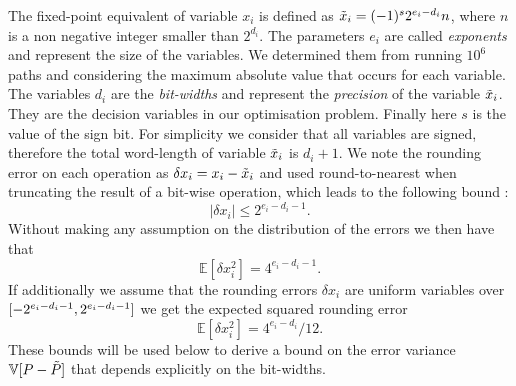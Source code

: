 The fixed-point equivalent of variable $x_i$ is defined as $\Tilde{x}_i = (-1)^s 2^{e_i-d_i}n$, where $n$ is a non negative integer smaller than $2^{d_i}$. The parameters $e_i$ are called \textit{exponents} and represent the size of the variables. We determined them from running $10^6$ paths and considering the maximum absolute value that occurs for each variable. The variables $d_i$ are the \textit{bit-widths} and represent the \textit{precision} of the variable $\Tilde{x}_i$. They are the decision variables in our optimisation problem. Finally here $s$ is the value of the sign bit. For simplicity we consider that all variables are signed, therefore the total word-length of variable $\Tilde{x}_i$ is $d_i+1$. We note the rounding error on each operation as $\delta x_i = x_i - \Tilde{x}_i$ and used round-to-nearest when truncating the result of a bit-wise operation, which leads to the following bound :
\begin{equation}\label{bound_rounding_error}
    |\delta x_i | \leq 2^{e_i-d_i-1}.
\end{equation}
Without making any assumption on the distribution of the errors we then have that
\begin{equation} \label{bound_err2}
    \mathbb{E}[\delta x_i^2] = 4^{e_i-d_i-1}.
\end{equation}
If additionally we assume that the rounding errors $\delta x_i$ are uniform variables over $[-2^{e_i-d_i-1},\\ 2^{e_i-d_i-1}]$ we get the expected squared rounding error
\begin{equation} \label{bound_err}
    \mathbb{E}[\delta x_i^2] = 4^{e_i-d_i}/12.
\end{equation}
These bounds will be used below to derive a bound on the error variance $\mathbb{V}[P-\Tilde{P}]$ that depends explicitly on the bit-widths. 


